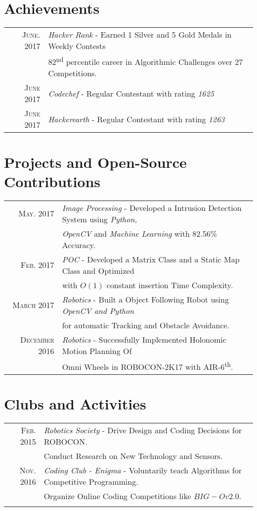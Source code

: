 \documentclass[a4paper,10pt]{article}
\begin{document}
\section{Achievements}
\begin{tabular}{rl}
 \textsc{June.} 2017 & {\large\emph{Hacker Rank}} - Earned 1 Silver and 5 Gold Medals in Weekly Contests \\ & 82\textsuperscript{nd} percentile career in Algorithmic Challenges over 27 Competitions.\\
\textsc{June} 2017 & {\large\emph{Codechef}} - Regular Contestant with rating \emph{1625}\\
\textsc{June} 2017 & {\large\emph{Hackerearth}} - Regular Contestant with rating \emph{1263}\\
\end{tabular}

\section{Projects and Open-Source Contributions}
\begin{tabular}{rl}
\textsc{May.} 2017 & {\large\emph{Image Processing}} - Developed a Intrusion Detection System using \emph{Python,} \\ & \emph{OpenCV} and \emph{Machine Learning} with 82.56\% Accuracy.\\
\textsc{Feb.} 2017 & {\large\emph{POC}} - Developed a Matrix Class and a Static Map Class and Optimized \\ & with $O(1)$ constant insertion Time Complexity.\\
\textsc{March} 2017 & {\large\emph{Robotics}} - Built a Object Following Robot using \emph{OpenCV and Python}\\ & for automatic Tracking and Obstacle Avoidance.\\
\textsc{December} 2016 & {\large\emph{Robotics}} - Successfully Implemented Holonomic Motion Planning Of \\ & Omni Wheels in ROBOCON-2K17 with AIR-6\textsuperscript{th}.\\
\end{tabular}

\section{Clubs and Activities}
\begin{tabular}{rl}
\textsc{Feb.} 2015 & {\large\emph{Robotics Society}} - Drive Design and Coding Decisions for ROBOCON.\\& \nopagebreak
Conduct Research on New Technology and Sensors.\\ \nopagebreak
\textsc{Nov.} 2016 & {\large\emph{Coding Club - Enigma}} - Voluntarily teach Algorithms for Competitive Programming.\\& \nopagebreak
Organize Online Coding Competitions like $BIG-O v2.0$.\\ \nopagebreak
\end{tabular}
\end{document}
